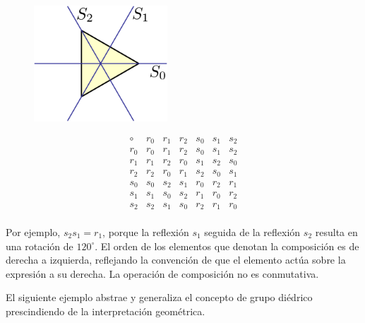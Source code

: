 \begin{figure}
    \includegraphics[width=5cm]{src/img/diedrico.png}
\end{figure}

\[
\begin{array}{c|cccccc}
\circ & r_0 & r_1 & r_2 & s_0 & s_1 & s_2 \\
\hline
r_0 & r_0 & r_1 & r_2 & s_0 & s_1 & s_2 \\
r_1 & r_1 & r_2 & r_0 & s_1 & s_2 & s_0 \\
r_2 & r_2 & r_0 & r_1 & s_2 & s_0 & s_1 \\
s_0 & s_0 & s_2 & s_1 & r_0 & r_2 & r_1 \\
s_1 & s_1 & s_0 & s_2 & r_1 & r_0 & r_2 \\
s_2 & s_2 & s_1 & s_0 & r_2 & r_1 & r_0 \\
\end{array}
\]



Por ejemplo, \(s_2 s_1 = r_1\), porque la reflexión \(s_1\) seguida de la reflexión \(s_2\) resulta en una rotación de \(120^\circ\). El orden de los elementos que denotan la composición es de derecha a izquierda, reflejando la convención de que el elemento actúa sobre la expresión a su derecha. La operación de composición no es conmutativa.

\clearpage

El siguiente ejemplo abstrae y generaliza el concepto de grupo diédrico prescindiendo de la interpretación geométrica.



